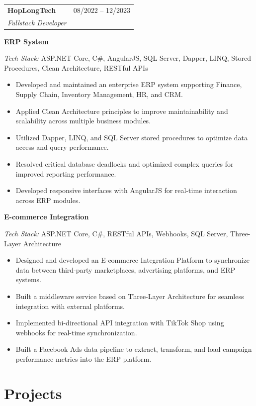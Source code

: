 \documentclass[a4paper,10pt]{article}
\makeatletter
\newcommand{\cventry}[4]{%
    \noindent
    \begin{tabularx}{\linewidth}{@{}X r@{}}
        \textbf{\color{darktext}#1} & \textcolor{lighttext}{\small #2} \\
        \textit{\color{primary}#3} & \\
    \end{tabularx}
    \vspace{-0.3em}
    #4
    \vspace{0.5em}
}
\newcommand{\projectentry}[2]{%
    \noindent
    \textbf{\color{darktext}#1}
    \vspace{-0.3em}
    #2
    \vspace{0.5em}
}
\newcommand{\techstack}[1]{%
    \vspace{-0.3em}
    \noindent\textcolor{lighttext}{\small\textit{Tech Stack:} #1}
    \vspace{0.2em}
}
\makeatother
\begin{document}
\cventry{HopLongTech}{08/2022 -- 12/2023}{Fullstack Developer}{

    \projectentry{ERP System}{
        \techstack{ASP.NET Core, C\#, AngularJS, SQL Server, Dapper, LINQ, Stored Procedures, Clean Architecture, RESTful APIs}

        \begin{itemize}[leftmargin=1.2em, itemsep=0.1em, topsep=0.2em]
            \item Developed and maintained an enterprise ERP system supporting Finance, Supply Chain, Inventory Management, HR, and CRM.
            \item Applied Clean Architecture principles to improve maintainability and scalability across multiple business modules.
            \item Utilized Dapper, LINQ, and SQL Server stored procedures to optimize data access and query performance.
            \item Resolved critical database deadlocks and optimized complex queries for improved reporting performance.
            \item Developed responsive interfaces with AngularJS for real-time interaction across ERP modules.
        \end{itemize}
    }

    \projectentry{E-commerce Integration}{
        \techstack{ASP.NET Core, C\#, RESTful APIs, Webhooks, SQL Server, Three-Layer Architecture}

        \begin{itemize}[leftmargin=1.2em, itemsep=0.1em, topsep=0.2em]
            \item Designed and developed an E-commerce Integration Platform to synchronize data between third-party marketplaces, advertising platforms, and ERP systems.
            \item Built a middleware service based on Three-Layer Architecture for seamless integration with external platforms.
            \item Implemented bi-directional API integration with TikTok Shop using webhooks for real-time synchronization.
            \item Built a Facebook Ads data pipeline to extract, transform, and load campaign performance metrics into the ERP platform.
        \end{itemize}
    }
}

\section{Projects}
\end{document}
